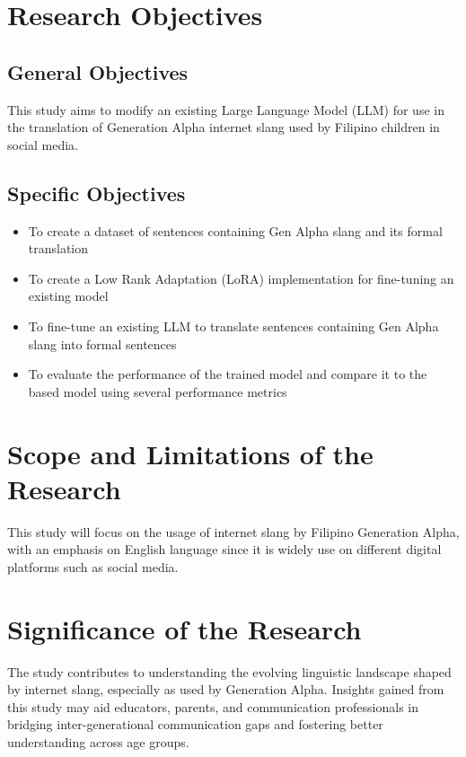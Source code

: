 \section{Research Objectives}
\label{sec:research_objectives}

\subsection{General Objectives}
\label{sec:general_objectives}
This study aims to modify an existing Large Language Model (LLM) for use in the translation of Generation Alpha internet slang used by Filipino children in social media.
\subsection{Specific Objectives}
\label{sec:specific_objectives}
\begin{itemize}
	\item To create a dataset of sentences containing Gen Alpha slang and its formal translation
	\item To create a Low Rank Adaptation (LoRA) implementation for fine-tuning an existing model
	\item To fine-tune an existing LLM to translate sentences containing Gen Alpha slang into formal sentences
	\item To evaluate the performance of the trained model and compare it to the based model using several performance metrics
\end{itemize}

\section{Scope and Limitations of the Research}
\label{sec:scope}
This study will focus on the usage of internet slang by Filipino Generation Alpha, with an emphasis on English language since it is widely use on different digital platforms such as social media.

\section{Significance of the Research}
\label{sec:significance}
The study contributes to understanding the evolving linguistic landscape shaped by internet slang, especially as used by Generation Alpha.
Insights gained from this study may aid educators, parents, and communication professionals in bridging inter-generational communication gaps and fostering better understanding across age groups.